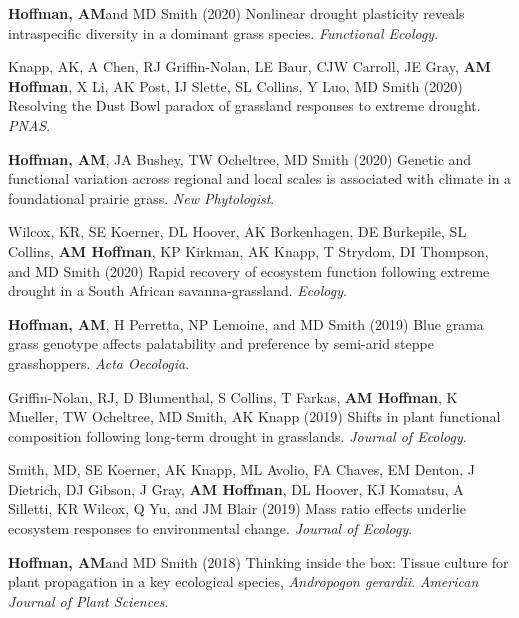 \documentclass{cv}
\begin{document}
\begin{pubenum}
\item\textbf{Hoffman, AM}\footnotemark[1] and MD Smith (2020) Nonlinear drought plasticity reveals intraspecific diversity in a dominant grass species. \textit{Functional Ecology}. \footnotemark[\value{footnote}]

\item Knapp, AK, A Chen, RJ Griffin-Nolan, LE Baur, CJW Carroll, JE Gray, \textbf{AM Hoffman}, X Li, AK Post, IJ Slette, SL Collins, Y Luo, MD Smith (2020) Resolving the Dust Bowl paradox of grassland responses to extreme drought. \textit{PNAS}. 

\item\textbf{Hoffman, AM}\footnotemark[1], JA Bushey, TW Ocheltree, MD Smith (2020) Genetic and functional variation across regional and local scales is associated with climate in a foundational prairie grass. \textit{New Phytologist}. 

\item Wilcox, KR, SE Koerner, DL Hoover, AK Borkenhagen, DE Burkepile, SL Collins, \textbf{AM Hoffman}, KP Kirkman, AK Knapp, T Strydom, DI Thompson, and MD Smith (2020) Rapid recovery of ecosystem function following extreme drought in a South African savanna-grassland. \textit{Ecology}. 

\item\textbf{Hoffman, AM}\footnotemark[1], H Perretta\footnotemark[2], NP Lemoine, and MD Smith (2019) Blue grama grass genotype affects palatability and preference by semi-arid steppe grasshoppers. \textit{Acta Oecologia}. 

\item Griffin-Nolan, RJ, D Blumenthal, S Collins, T Farkas, \textbf{AM Hoffman}, K Mueller, TW Ocheltree, MD Smith, AK Knapp (2019) Shifts in plant functional composition following long-term drought in grasslands. \textit{Journal of Ecology}. 

\item Smith, MD, SE Koerner, AK Knapp, ML Avolio, FA Chaves, EM Denton, J Dietrich, DJ Gibson, J Gray, \textbf{AM Hoffman}, DL Hoover, KJ Komatsu, A Silletti, KR Wilcox, Q Yu, and JM Blair (2019) Mass ratio effects underlie ecosystem responses to environmental change. \textit{Journal of Ecology}. 

\item\textbf{Hoffman, AM}\footnotemark[1] and MD Smith (2018) Thinking inside the box: Tissue culture for plant propagation in a key ecological species, \textit{Andropogon gerardii}. \textit{American Journal of Plant Sciences}.  


\end{pubenum}
\end{document}

